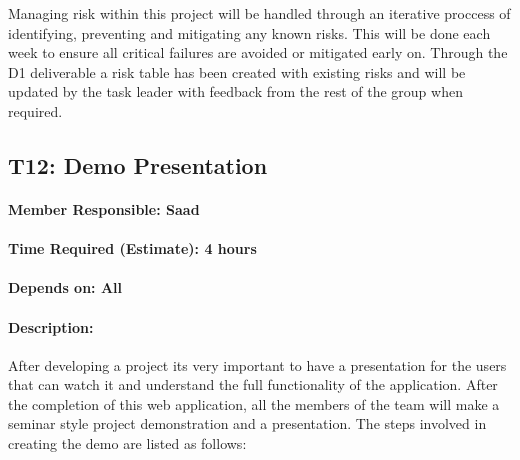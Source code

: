 \documentclass[
  english,
  paper=a4,
  oneside  ,captions=tableheading
]{scrbook}
\begin{document}
Managing risk within this project will be handled through an iterative
proccess of identifying, preventing and mitigating any known risks. This
will be done each week to ensure all critical failures are avoided or
mitigated early on. Through the D1 deliverable a risk table has been
created with existing risks and will be updated by the task leader with
feedback from the rest of the group when required.

\newpage
\hypertarget{t12-demo-presentation}{%
\subsection{T12: Demo Presentation}\label{t12-demo-presentation}}

\hypertarget{member-responsible-saad}{%
\paragraph{Member Responsible: Saad}\label{member-responsible-saad}}

\hypertarget{time-required-estimate-4-hours}{%
\paragraph{Time Required (Estimate): 4
hours}\label{time-required-estimate-4-hours}}

\hypertarget{depends-on-all-2}{%
\paragraph{Depends on: All}\label{depends-on-all-2}}

\hypertarget{description-10}{%
\paragraph{Description:}\label{description-10}}

After developing a project its very important to have a presentation for
the users that can watch it and understand the full functionality of the
application. After the completion of this web application, all the
members of the team will make a seminar style project demonstration and
a presentation. The steps involved in creating the demo are listed as
follows:
\end{document}
